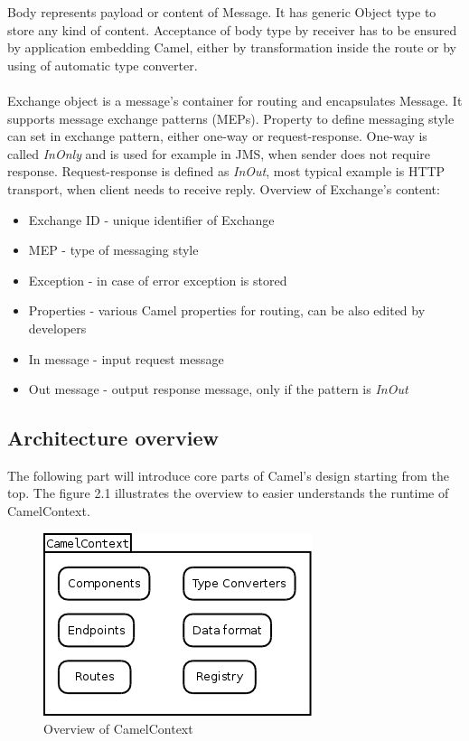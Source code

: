 \documentclass[12pt,final,oneside]{fithesis2}
\begin{document}
Body represents payload or content of Message. It has generic Object type to store any kind of content. Acceptance of body type by receiver has to be ensured by application embedding Camel, either by transformation inside the route or by using of automatic type converter.
\\ \\
Exchange object is a message's container for routing and encapsulates Message. It supports message exchange patterns (MEPs). Property to define messaging style can set in exchange pattern, either one-way or request-response. One-way is called \textit{InOnly} and is used for example in JMS, when sender does not require response. Request-response is defined as \textit{InOut}, most typical example is HTTP transport, when client needs to receive reply.
Overview of Exchange's content:
\begin{itemize}
\item Exchange ID - unique identifier of Exchange
\item MEP - type of messaging style
\item Exception - in case of error exception is stored
\item Properties - various Camel properties for routing, can be also edited by developers
\item In message - input request message
\item Out message - output response message, only if the pattern is \textit{InOut}
\end{itemize}



\subsection{Architecture overview}
The following part will introduce core parts of Camel's design starting from the top. The figure 2.1 illustrates the overview to easier understands the runtime of CamelContext.

\begin{figure}[!h]
\centering
\includegraphics[width=0.5\linewidth]{images/camelContext.png}
\caption{Overview of CamelContext}
\end{figure}
\end{document}
